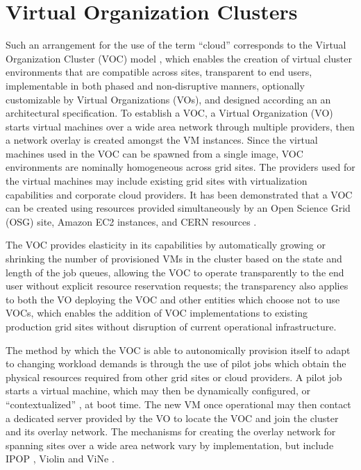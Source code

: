 \section{Virtual Organization Clusters}
Such an arrangement for the use of the term ``cloud'' corresponds to the Virtual
Organization Cluster (VOC) model \cite{Murphy2009, Murphy2009a,Murphy2010},
which enables the creation of virtual cluster environments that are compatible
across sites, transparent to end users, implementable in both phased and
non-disruptive manners, optionally customizable by Virtual Organizations
(VOs), and designed according an an architectural specification. To establish
a VOC, a Virtual Organization (VO) starts virtual machines over a wide area
network through multiple providers, then a network overlay is created amongst
the VM instances. Since the virtual machines used in the VOC can be spawned
from a single image, VOC environments are nominally homogeneous across grid
sites. The providers used for the virtual machines may include existing grid
sites with virtualization capabilities and corporate cloud providers. It
has been demonstrated that a VOC can be created using resources provided
simultaneously by an Open Science Grid (OSG) site, Amazon EC2 instances, and
CERN resources \cite{Stout10}. 

The VOC provides elasticity in its capabilities
by automatically growing or shrinking the number of provisioned VMs in the
cluster based on the state and length of the job queues, allowing the VOC to
operate transparently to the end user without explicit resource reservation
requests; the transparency also applies to both the VO deploying the VOC and
other entities which choose not to use VOCs, which enables the addition of VOC
implementations to existing production grid sites without disruption of current
operational infrastructure. 

The method by which the VOC is able to autonomically
provision itself to adapt to changing workload demands is through the use of
pilot jobs which obtain the physical resources required from other grid sites
or cloud providers. A pilot job starts a virtual machine, which may then be
dynamically configured, or ``contextualized'' \cite{Keahey2008}, at boot time.
The new VM once operational may then contact a dedicated server provided by
the VO to locate the VOC and join the cluster and its overlay network. The
mechanisms for creating the overlay network for spanning sites over a wide area
network vary by implementation, but include IPOP \cite{Ganguly2006}, Violin
\cite{Ruth2005} and ViNe \cite{Tsugawa2006}.

